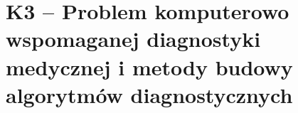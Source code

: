 \section{K3 -- Problem komputerowo wspomaganej diagnostyki medycznej i metody budowy algorytmów diagnostycznych}